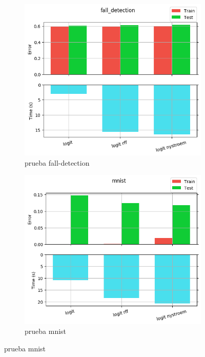 \begin{figure}[ht]
  \centering
  \begin{subfigure}[b]{0.5\linewidth}
    \centering\includegraphics[width=\imgscale\linewidth]{Figures/2_1/fall_detection}
    \caption{prueba fall-detection}
    \label{fig:2_1_fall_detection}
  \end{subfigure}%
  \begin{subfigure}[b]{0.5\linewidth}
    \centering\includegraphics[width=\imgscale\linewidth]{Figures/2_1/mnist}
    \caption{prueba mnist}
    \label{fig:2_1_mnist}
  \end{subfigure}
\end{figure}


